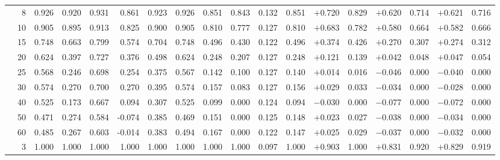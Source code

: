 \documentclass[conference]{IEEEtran}
\theoremstyle{remark}
\begin{document}
\begin{table}[ht]
{\begin{tabular}{p{2.2cm}r rrrr rr rr rr rr rr rr}
  & 8  & 0.926 & 0.920 & 0.931 & 0.861 & 0.923 & 0.926 & 0.851 & 0.843 & 0.132 & 0.851 & $+$0.720 & 0.829 & $+$0.620 & 0.714 & $+$0.621 & 0.716 \\
  & 10 & 0.905 & 0.895 & 0.913 & 0.825 & 0.900 & 0.905 & 0.810 & 0.777 & 0.127 & 0.810 & $+$0.683 & 0.782 & $+$0.580 & 0.664 & $+$0.582 & 0.666 \\
  & 15 & 0.748 & 0.663 & 0.799 & 0.574 & 0.704 & 0.748 & 0.496 & 0.430 & 0.122 & 0.496 & $+$0.374 & 0.426 & $+$0.270 & 0.307 & $+$0.274 & 0.312 \\
  & 20 & 0.624 & 0.397 & 0.727 & 0.376 & 0.498 & 0.624 & 0.248 & 0.207 & 0.127 & 0.248 & $+$0.121 & 0.139 & $+$0.042 & 0.048 & $+$0.047 & 0.054 \\
  & 25 & 0.568 & 0.246 & 0.698 & 0.254 & 0.375 & 0.567 & 0.142 & 0.100 & 0.127 & 0.140 & $+$0.014 & 0.016 & $-$0.046 & 0.000 & $-$0.040 & 0.000 \\
  & 30 & 0.574 & 0.270 & 0.700 & 0.270 & 0.395 & 0.574 & 0.157 & 0.083 & 0.127 & 0.156 & $+$0.029 & 0.033 & $-$0.034 & 0.000 & $-$0.028 & 0.000 \\
  & 40 & 0.525 & 0.173 & 0.667 & 0.094 & 0.307 & 0.525 & 0.099 & 0.000 & 0.124 & 0.094 & $-$0.030 & 0.000 & $-$0.077 & 0.000 & $-$0.072 & 0.000 \\
  & 50 & 0.471 & 0.274 & 0.584 & -0.074 & 0.385 & 0.469 & 0.151 & 0.000 & 0.125 & 0.148 & $+$0.023 & 0.027 & $-$0.038 & 0.000 & $-$0.034 & 0.000 \\
  & 60 & 0.485 & 0.267 & 0.603 & -0.014 & 0.383 & 0.494 & 0.167 & 0.000 & 0.122 & 0.147 & $+$0.025 & 0.029 & $-$0.037 & 0.000 & $-$0.032 & 0.000 \\
\midrule
{}
  & 3  & 1.000 & 1.000 & 1.000 & 1.000 & 1.000 & 1.000 & 1.000 & 1.000 & 0.097 & 1.000 & $+$0.903 & 1.000 & $+$0.831 & 0.920 & $+$0.829 & 0.919 \\

\end{tabular}}
\end{table}
\end{document}
